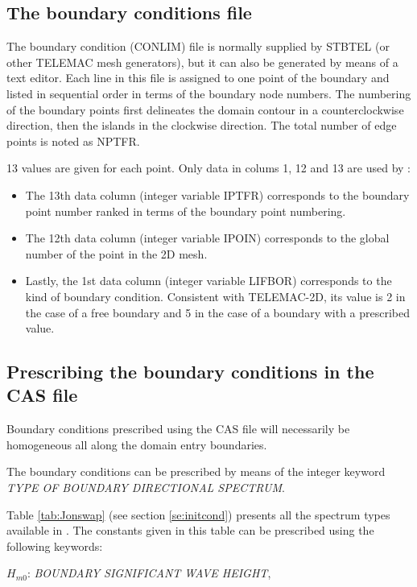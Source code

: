 \subsection{ The boundary conditions file}
\label{se:BCfile}
 The boundary condition (CONLIM) file is normally supplied by STBTEL (or other TELEMAC mesh generators), but it can also be generated by means of a text editor. Each line in this file is assigned to one point of the boundary and listed in sequential order in terms of the boundary node numbers. The numbering of the boundary points first delineates the domain contour in a counterclockwise direction, then the islands in the clockwise direction. The total number of edge points is noted as NPTFR.

 13 values are given for each point. Only data in colums 1, 12 and 13 are used by \tomawac:

\begin{itemize}
\item  The 13th data column (integer variable IPTFR) corresponds to the boundary point number ranked in terms of the boundary point numbering.

\item  The 12th data column (integer variable IPOIN) corresponds to the global number of the point in the 2D mesh.

\item  Lastly, the 1st data column (integer variable LIFBOR) corresponds to the kind of boundary condition. Consistent with TELEMAC-2D, its value is 2 in the case of a free boundary and 5 in the case of a boundary with a prescribed value.
\end{itemize}


\subsection{ Prescribing the boundary conditions in the CAS file}

 Boundary conditions prescribed using the CAS file will necessarily be homogeneous all along the domain entry boundaries.

 The boundary conditions can be prescribed by means of the integer keyword \textit{TYPE OF BOUNDARY DIRECTIONAL SPECTRUM}.

 Table \ref{tab:Jonswap} (see section \ref{se:initcond}) presents all the spectrum types available in \tomawac. The constants given in this table can be prescribed using the following keywords:

  $H_{m0}$: \textit{BOUNDARY SIGNIFICANT WAVE HEIGHT},

